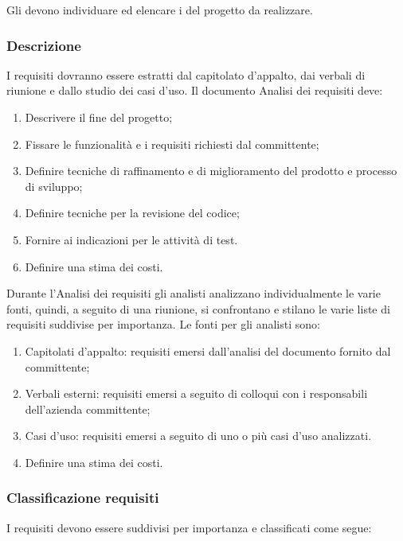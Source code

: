 \documentclass[../NomeDocumento.tex]{subfiles}
\begin{document}
	Gli  devono individuare ed elencare i  del progetto da realizzare.
	
	\subsubsection{Descrizione}
	
	I requisiti dovranno essere estratti dal capitolato d’appalto, dai verbali di riunione e dallo studio dei casi d’uso. 
	Il documento Analisi dei requisiti deve:
	
	\begin{enumerate}
		\item Descrivere il fine del progetto;
		\item Fissare le funzionalità e i requisiti richiesti dal committente;
		\item Definire tecniche di raffinamento e di miglioramento del prodotto e processo di sviluppo;
		\item Definire tecniche per la revisione del codice;
		\item Fornire ai  indicazioni per le attività di test.
		\item Definire una stima dei costi.
	\end{enumerate}

	Durante l’Analisi dei requisiti gli analisti analizzano individualmente le varie fonti, quindi, a seguito di una riunione, si confrontano e stilano le varie liste di requisiti suddivise per importanza. Le fonti per gli analisti sono:
	 
	\begin{enumerate}
		\item Capitolati d’appalto: requisiti emersi dall’analisi del documento fornito dal committente;
		\item Verbali esterni: requisiti emersi a seguito di colloqui con i responsabili dell’azienda committente;
		\item Casi d'uso: requisiti emersi a seguito di uno o più casi d’uso analizzati.
		\item Definire una stima dei costi.
	\end{enumerate}

	\subsubsection{Classificazione requisiti} 
	
	I requisiti devono essere suddivisi per importanza e classificati come segue:
	
\end{document}
